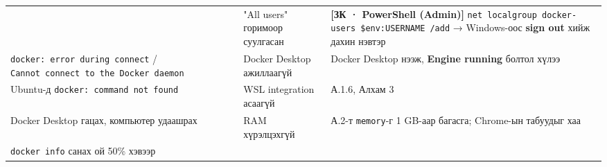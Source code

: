 \begin{longtable}[]{@{}lll@{}}
\begin{minipage}[t]{0.30\columnwidth}
\end{minipage} & \begin{minipage}[t]{0.30\columnwidth}\raggedright
"All users" горимоор суулгасан\strut
\end{minipage} & \begin{minipage}[t]{0.30\columnwidth}\raggedright
\textbf{{[}ЗК · PowerShell (Admin){]}} \texttt{net\ localgroup\ docker-users\ \$env:\allowbreak{}USERNAME\ /\allowbreak{}add} → Windows-оос \textbf{sign out} хийж дахин нэвтэр\strut
\end{minipage}\tabularnewline
\begin{minipage}[t]{0.30\columnwidth}\raggedright
\texttt{docker:\allowbreak{}\ error\ during\ connect} / \texttt{Cannot\ connect\ to\ the\ Docker\ daemon}\strut
\end{minipage} & \begin{minipage}[t]{0.30\columnwidth}\raggedright
Docker Desktop ажиллаагүй\strut
\end{minipage} & \begin{minipage}[t]{0.30\columnwidth}\raggedright
Docker Desktop нээж, \textbf{Engine running} болтол хүлээ\strut
\end{minipage}\tabularnewline
\begin{minipage}[t]{0.30\columnwidth}\raggedright
Ubuntu-д \texttt{docker:\allowbreak{}\ command\ not\ found}\strut
\end{minipage} & \begin{minipage}[t]{0.30\columnwidth}\raggedright
WSL integration асаагүй\strut
\end{minipage} & \begin{minipage}[t]{0.30\columnwidth}\raggedright
А.1.6, Алхам 3\strut
\end{minipage}\tabularnewline
\begin{minipage}[t]{0.30\columnwidth}\raggedright
Docker Desktop гацах, компьютер удаашрах\strut
\end{minipage} & \begin{minipage}[t]{0.30\columnwidth}\raggedright
RAM хүрэлцэхгүй\strut
\end{minipage} & \begin{minipage}[t]{0.30\columnwidth}\raggedright
А.2-т \texttt{memory}-г 1 GB-аар багасга; Chrome-ын табуудыг хаа\strut
\end{minipage}\tabularnewline
\begin{minipage}[t]{0.30\columnwidth}\raggedright
\texttt{docker\ info} санах ой 50\% хэвээр\strut
\end{minipage} & \begin{minipage}[t]{0.30\columnwidth}\raggedright

\end{minipage}
\end{longtable}

